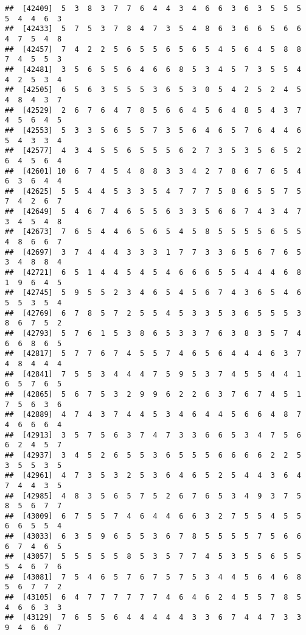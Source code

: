 \documentclass[
]{book}
\begin{document}
\begin{verbatim}
##  [42409]  5  3  8  3  7  7  6  4  4  3  4  6  6  3  6  3  5  5  5  5  4  4  6  3
##  [42433]  5  7  5  3  7  8  4  7  3  5  4  8  6  3  6  6  5  6  6  4  7  5  4  8
##  [42457]  7  4  2  2  5  6  5  5  6  5  6  5  4  5  6  4  5  8  8  7  4  5  5  3
##  [42481]  3  5  6  5  5  6  4  6  6  8  5  3  4  5  7  3  5  5  4  4  2  5  3  4
##  [42505]  6  5  6  3  5  5  5  3  6  5  3  0  5  4  2  5  2  4  5  4  8  4  3  7
##  [42529]  2  6  7  6  4  7  8  5  6  6  4  5  6  4  8  5  4  3  7  4  5  6  4  5
##  [42553]  5  3  3  5  6  5  5  7  3  5  6  4  6  5  7  6  4  4  6  5  4  3  3  4
##  [42577]  4  3  4  5  5  6  5  5  5  6  2  7  3  5  3  5  6  5  2  6  4  5  6  4
##  [42601] 10  6  7  4  5  4  8  8  3  3  4  2  7  8  6  7  6  5  4  6  3  6  4  4
##  [42625]  5  5  4  4  5  3  3  5  4  7  7  7  5  8  6  5  5  7  5  7  4  2  6  7
##  [42649]  5  4  6  7  4  6  5  5  6  3  3  5  6  6  7  4  3  4  7  3  4  5  4  8
##  [42673]  7  6  5  4  4  6  5  6  5  4  5  8  5  5  5  5  6  5  5  4  8  6  6  7
##  [42697]  3  7  4  4  4  3  3  3  1  7  7  3  3  6  5  6  7  6  5  3  4  8  8  4
##  [42721]  6  5  1  4  4  5  4  5  4  6  6  6  5  5  4  4  4  6  8  1  9  6  4  5
##  [42745]  5  9  5  5  2  3  4  6  5  4  5  6  7  4  3  6  5  4  6  5  5  3  5  4
##  [42769]  6  7  8  5  7  2  5  5  4  5  3  3  5  3  6  5  5  5  3  8  6  7  5  2
##  [42793]  5  7  6  1  5  3  8  6  5  3  3  7  6  3  8  3  5  7  4  6  6  8  6  5
##  [42817]  5  7  7  6  7  4  5  5  7  4  6  5  6  4  4  4  6  3  7  4  8  4  4  4
##  [42841]  7  5  5  3  4  4  4  7  5  9  5  3  7  4  5  5  4  4  1  6  5  7  6  5
##  [42865]  5  6  7  5  3  2  9  9  6  2  2  6  3  7  6  7  4  5  1  7  5  6  3  6
##  [42889]  4  7  4  3  7  4  4  5  3  4  6  4  4  5  6  6  4  8  7  4  6  6  6  4
##  [42913]  3  5  7  5  6  3  7  4  7  3  3  6  6  5  3  4  7  5  6  6  2  4  5  7
##  [42937]  3  4  5  2  6  5  5  3  6  5  5  5  6  6  6  6  2  2  5  3  5  5  3  5
##  [42961]  4  7  3  5  3  2  5  3  6  4  6  5  2  5  4  4  3  6  4  7  4  4  3  5
##  [42985]  4  8  3  5  6  5  7  5  2  6  7  6  5  3  4  9  3  7  5  8  5  6  7  7
##  [43009]  6  7  5  5  7  4  6  4  4  6  6  3  2  7  5  5  4  5  5  6  6  5  5  4
##  [43033]  6  3  5  9  6  5  5  3  6  7  8  5  5  5  5  7  5  6  6  6  7  4  6  5
##  [43057]  5  5  5  5  5  8  5  3  5  7  7  4  5  3  5  5  6  5  5  5  4  6  7  6
##  [43081]  7  5  4  6  5  7  6  7  5  7  5  3  4  4  5  6  4  6  8  5  6  7  7  2
##  [43105]  6  4  7  7  7  7  7  7  4  6  4  6  2  4  5  5  7  8  5  4  6  6  3  3
##  [43129]  7  6  5  5  6  4  4  4  4  4  3  3  6  7  4  4  7  3  3  9  4  6  6  7

\end{verbatim}
\end{document}
